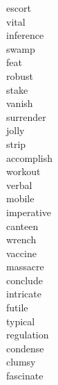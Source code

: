\documentclass[a4paper, 10pt]{ctexart}
\begin{document}
\begin{multicols*}{2}
\begin{description}
\item[escort]

\item[vital]

\item[inference]

\item[swamp]

\item[feat]

\item[robust]

\item[stake]

\item[vanish]

\item[surrender]

\item[jolly]

\item[strip]

\item[accomplish]

\item[workout]

\item[verbal]

\item[mobile]

\item[imperative]

\item[canteen]

\item[wrench]

\item[vaccine]

\item[massacre]

\item[conclude]

\item[intricate]

\item[futile]

\item[typical]

\item[regulation]

\item[condense]

\item[clumsy]

\item[fascinate]


\end{description}
\end{multicols*}
\end{document}
